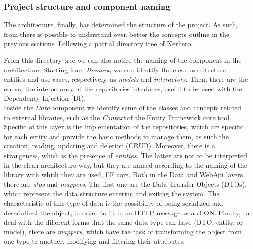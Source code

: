 \subsubsection{Project structure and component naming}
The architecture, finally, has determined the structure of the project. As such, from there is possible to understand even better the concepts outline in the previous sections. Following a partial directory tree of Kerbero. 
\begin{scriptsize}
\setlength{\DTbaselineskip}{8.5pt}
\end{scriptsize}
\hfill \break
From this directory tree we can also notice the naming of the component in the architecture. Starting from \textit{Domain}, we can identify the clean architecture entities and use cases, respectively, as \textit{models} and \textit{interactors}. Then, there are the errors, the interactors and the repositories interfaces, useful to be used with the Dependency Injection (DI).
\\ Inside the \textit{Data} component we identify some of the classes and concepts related to external libraries, such as the \textit{Context} of the Entity Framework core tool. Specific of this layer is the implementation of the repositories, which are specific for each entity and provide the basic methods to manage them, as such the creation, reading, updating and deletion (CRUD). Moreover, there is a strangeness, which is the presence of \textit{entities}. The latter are not to be interpreted in the clean architecture way, but they are named according to the naming of the library with which they are used, EF core. Both in the Data and WebApi layers, there are \textit{dtos} and \textit{mappers}. The first one are the Data Transfer Objects (DTOs), which represent the data structure entering and exiting the system. The characteristic of this type of data is the possibility of being serialized and deserialized the object, in order to fit in an HTTP message as a JSON. Finally, to deal with the different forms that the same data type can have (DTO, entity, or model), there are \textit{mappers}, which have the task of transforming the object from one type to another, modifying and filtering their attributes.

